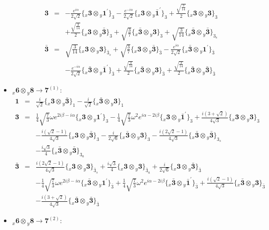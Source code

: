 \documentclass[english]{article}
\newcommand{\rep}[1]{\mathbf{#1}}
\newcommand{\repx}[2]{{}_{#2}\mathbf{#1}}
\newcommand{\subcg}[3]{\big\{ \repx{#1}{x}\otimes\repx{#2}{y}\big\}^{}_{#3}}
\begin{document}
\begin{itemize}
\begin{eqnarray*}
\rep{3} &=& -\frac{e^{i \alpha }}{2 \sqrt{2}}\subcg{3}{1^{\prime}}{3}-\frac{e^{-i \alpha }}{2 \sqrt{2}}\subcg{3}{\bar{1}^{\prime}}{3}+\frac{\sqrt{\frac{3}{14}}}{2}\subcg{3}{3}{3} \\ 
 & & +\frac{\sqrt{\frac{3}{14}}}{2}\subcg{3}{\bar{3}}{3}+\sqrt{\frac{3}{7}}\subcg{\bar{3}}{3}{3}+\sqrt{\frac{3}{14}}\subcg{\bar{3}}{\bar{3}}{3_{s}}
\\
\rep{\bar{3}} &=& \sqrt{\frac{3}{14}}\subcg{3}{3}{\bar{3}_{s}}+\sqrt{\frac{3}{7}}\subcg{3}{\bar{3}}{\bar{3}}-\frac{e^{i \alpha }}{2 \sqrt{2}}\subcg{\bar{3}}{1^{\prime}}{\bar{3}} \\ 
 & & -\frac{e^{-i \alpha }}{2 \sqrt{2}}\subcg{\bar{3}}{\bar{1}^{\prime}}{\bar{3}}+\frac{\sqrt{\frac{3}{14}}}{2}\subcg{\bar{3}}{3}{\bar{3}}+\frac{\sqrt{\frac{3}{14}}}{2}\subcg{\bar{3}}{\bar{3}}{\bar{3}}
\end{eqnarray*}
\item $\repx{6}{x}\otimes\repx{8}{y}\to\rep{7}^{(1)}$:
\begin{eqnarray*}
\rep{1} &=& \frac{i}{\sqrt{2}}\subcg{3}{\bar{3}}{1}-\frac{i}{\sqrt{2}}\subcg{\bar{3}}{3}{1}
\\
\rep{3} &=& \frac{1}{4} \sqrt{\frac{7}{3}} \omega  e^{2 i \beta -i \alpha }\subcg{3}{1^{\prime}}{3}-\frac{1}{4} \sqrt{\frac{7}{3}} \omega ^2 e^{i \alpha -2 i \beta }\subcg{3}{\bar{1}^{\prime}}{3}+\frac{i \left(3+\sqrt{2}\right)}{4 \sqrt{3}}\subcg{3}{3}{3} \\ 
 & & -\frac{i \left(\sqrt{2}-1\right)}{4 \sqrt{3}}\subcg{3}{\bar{3}}{3}-\frac{i}{2 \sqrt{6}}\subcg{\bar{3}}{3}{3}-\frac{i \left(2 \sqrt{2}-1\right)}{4 \sqrt{3}}\subcg{\bar{3}}{\bar{3}}{3_{s}} \\ 
 & & -\frac{i \sqrt{3}}{4}\subcg{\bar{3}}{\bar{3}}{3_{a}}
\\
\rep{\bar{3}} &=& \frac{i \left(2 \sqrt{2}-1\right)}{4 \sqrt{3}}\subcg{3}{3}{\bar{3}_{s}}+\frac{i \sqrt{3}}{4}\subcg{3}{3}{\bar{3}_{a}}+\frac{i}{2 \sqrt{6}}\subcg{3}{\bar{3}}{\bar{3}} \\ 
 & & -\frac{1}{4} \sqrt{\frac{7}{3}} \omega  e^{2 i \beta -i \alpha }\subcg{\bar{3}}{1^{\prime}}{\bar{3}}+\frac{1}{4} \sqrt{\frac{7}{3}} \omega ^2 e^{i \alpha -2 i \beta }\subcg{\bar{3}}{\bar{1}^{\prime}}{\bar{3}}+\frac{i \left(\sqrt{2}-1\right)}{4 \sqrt{3}}\subcg{\bar{3}}{3}{\bar{3}} \\ 
 & & -\frac{i \left(3+\sqrt{2}\right)}{4 \sqrt{3}}\subcg{\bar{3}}{\bar{3}}{\bar{3}}
\end{eqnarray*}
\item $\repx{6}{x}\otimes\repx{8}{y}\to\rep{7}^{(2)}$:

\end{itemize}
\end{document}

